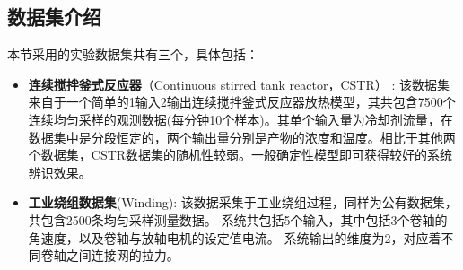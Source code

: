 \subsection{数据集介绍}
本节采用的实验数据集共有三个，具体包括：
\begin{itemize}
    \item \textbf{连续搅拌釜式反应器}（Continuous stirred tank reactor，CSTR） \cite{Demeester2019}:
    该数据集来自于一个简单的1输入2输出连续搅拌釜式反应器放热模型，其共包含7500个连续均匀采样的观测数据(每分钟10个样本)。其单个输入量为冷却剂流量，在数据集中是分段恒定的，两个输出量分别是产物的浓度和温度。相比于其他两个数据集，CSTR数据集的随机性较弱。一般确定性模型即可获得较好的系统辨识效果。
    
    \item \textbf{工业绕组数据集}(Winding)\cite{Demeester2019}: 
    该数据采集于工业绕组过程，同样为公有数据集，共包含2500条均匀采样测量数据。
    系统共包括5个输入，其中包括3个卷轴的角速度，以及卷轴与放轴电机的设定值电流。
    系统输出的维度为2，对应着不同卷轴之间连接网的拉力。
    

\end{itemize}
